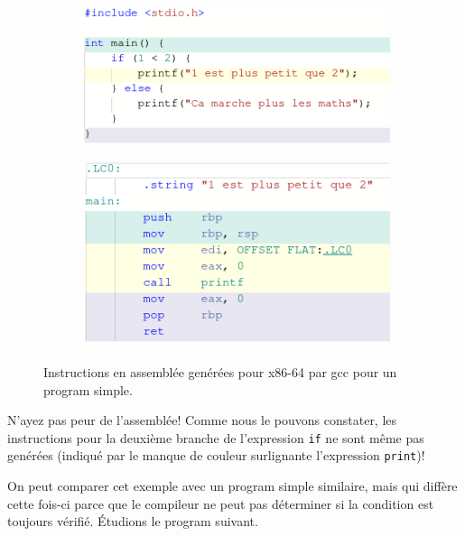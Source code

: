 \documentclass[11pt]{article} %
\begin{document}
\begin{figure}[h!]
    \centering
    \begin{subfigure}[h!]{0.4\textwidth}
        \includegraphics[width=\linewidth]{media/dce_left.png}
    \end{subfigure}
    \begin{subfigure}[h!]{0.4\textwidth}
        \includegraphics[width=\linewidth]{media/dce-right.png}
    \end{subfigure}
    \caption{Instructions en assembl\'ee gen\'er\'ees pour x86-64 par gcc pour un program simple.}
\end{figure}
N'ayez pas peur de l'assembl\'ee! Comme nous le pouvons constater, les instructions pour la deuxi\`eme branche de l'expression \verb|if| ne sont m\^eme
pas gen\'er\'ees (indiqu\'e par le manque de couleur surlignante l'expression \verb|print|)!

\newpage

On peut comparer cet exemple avec un program simple similaire, mais qui diff\`ere cette fois-ci parce que le compileur ne peut pas d\'eterminer si la condition
est toujours v\'erifi\'e. \'Etudions le program suivant.
\end{document}
